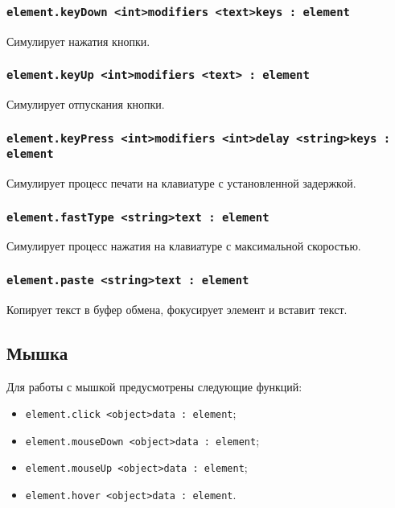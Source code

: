 \documentclass[a4paper, 14pt]{extarticle}
\newenvironment{icItems}
	{ \begin{itemize} [noitemsep,nolistsep] }
	{ \end{itemize} }
\begin{document}
\subsubsection{\lstinline|element.keyDown <int>modifiers <text>keys : element|}

Симулирует нажатия кнопки.

\subsubsection{\lstinline|element.keyUp <int>modifiers <text> : element|}

Симулирует отпускания кнопки.

\subsubsection{\lstinline|element.keyPress <int>modifiers <int>delay <string>keys : element|}

Симулирует процесс печати на клавиатуре с установленной задержкой.

\subsubsection{\lstinline|element.fastType <string>text : element|}

Симулирует процесс нажатия на клавиатуре с максимальной скоростью.

\subsubsection{\lstinline|element.paste <string>text : element|}

Копирует текст в буфер обмена, фокусирует элемент и вставит текст.

\subsection{Мышка}
\label{mouse}

Для работы с мышкой предусмотрены следующие функций:
\begin{icItems}
	\item \lstinline|element.click <object>data : element|;
	\item \lstinline|element.mouseDown <object>data : element|;
	\item \lstinline|element.mouseUp <object>data : element|;
	\item \lstinline|element.hover <object>data : element|.
\end{icItems}
\end{document}
